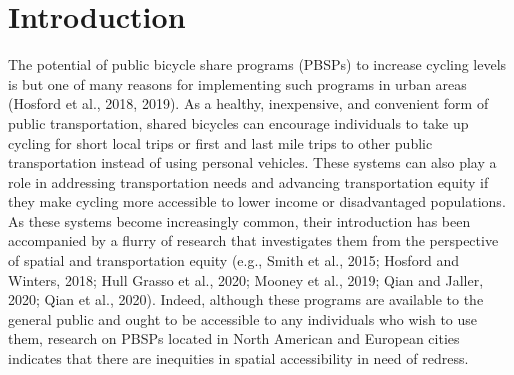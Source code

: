 \documentclass[]{elsarticle} %
\begin{document}
\newpage

\hypertarget{introduction}{%
\section{Introduction}\label{introduction}}

The potential of public bicycle share programs (PBSPs) to increase
cycling levels is but one of many reasons for implementing such programs
in urban areas (Hosford et al., 2018, 2019). As a healthy, inexpensive,
and convenient form of public transportation, shared bicycles can
encourage individuals to take up cycling for short local trips or first
and last mile trips to other public transportation instead of using
personal vehicles. These systems can also play a role in addressing
transportation needs and advancing transportation equity if they make
cycling more accessible to lower income or disadvantaged populations. As
these systems become increasingly common, their introduction has been
accompanied by a flurry of research that investigates them from the
perspective of spatial and transportation equity (e.g., Smith et al.,
2015; Hosford and Winters, 2018; Hull Grasso et al., 2020; Mooney et
al., 2019; Qian and Jaller, 2020; Qian et al., 2020). Indeed, although
these programs are available to the general public and ought to be
accessible to any individuals who wish to use them, research on PBSPs
located in North American and European cities indicates that there are
inequities in spatial accessibility in need of redress.
\end{document}
